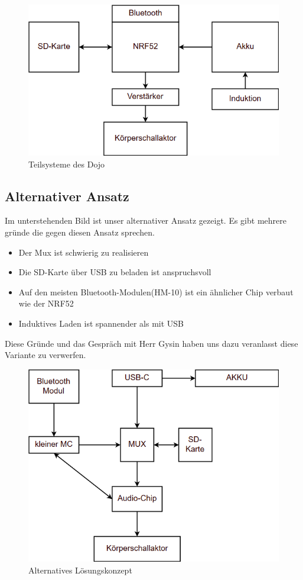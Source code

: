 \begin{figure}[H]
\begin{center}
	\includegraphics[width=120mm]{data/Loesungskonzept_Teilsysteme.png}
	\caption{Teilsysteme des Dojo} %
	\label{fig:first_layer}
\end{center}
\end{figure}


\subsection{Alternativer Ansatz}
Im unterstehenden Bild ist unser alternativer Ansatz gezeigt. Es gibt mehrere gründe die gegen diesen Ansatz sprechen.
\begin{itemize}
\item Der Mux ist schwierig zu realisieren
\item Die SD-Karte über USB zu beladen ist anspruchsvoll
\item Auf den meisten Bluetooth-Modulen(HM-10) ist ein ähnlicher Chip verbaut wie der NRF52
\item Induktives Laden ist spannender als mit USB
\end{itemize}
Diese Gründe und das Gespräch mit Herr Gysin haben uns dazu veranlasst diese Variante zu verwerfen.

\begin{figure}[H]
\begin{center}
	\includegraphics[width=120mm]{data/Loesungskonzept_alternativ.png}
	\caption{Alternatives Lösungskonzept} %
	\label{fig:first_layer}
\end{center}
\end{figure}


